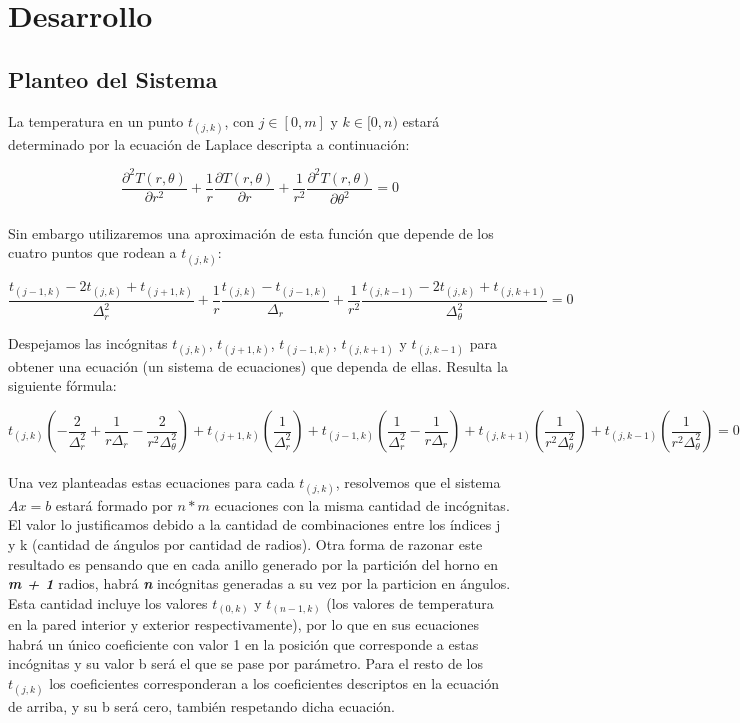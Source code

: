 \section{Desarrollo}

\subsection{Planteo del Sistema}


La temperatura en un punto $t_{(j,k)}$, con $j \in [0, m]$ y $k \in [0, n)$ estará determinado por la ecuación de Laplace descripta a continuación:


$$ \frac{\partial^{2}T(r,\theta)}{\partial r^{2}} + \frac{1}{r} \frac{\partial T(r,\theta)}{\partial r} + \frac{1}{r^{2}} \frac{\partial^{2}T(r,\theta)}{\partial \theta^{2}} = 0$$\\

Sin embargo utilizaremos una aproximación de esta función que depende de los cuatro puntos que rodean a $t_{(j,k)}$:


$$ \frac{t_{(j-1,k)} - 2t_{(j,k)} + t_{(j+1,k)}}{\Delta_{r} ^{2}} + \frac{1}{r} \frac{t_{(j,k)} - t_{(j-1,k)}}{\Delta_{r}} + \frac{1}{r^{2}} \frac{t_{(j,k-1)} - 2t_{(j,k)} + t_{(j,k+1)}}{\Delta_{\theta} ^{2}} = 0$$

Despejamos las incógnitas $t_{(j,k)}$, $t_{(j+1,k)}$, $t_{(j-1,k)}$, $t_{(j,k+1)}$ y $t_{(j,k-1)}$ para obtener una ecuación (un sistema de ecuaciones) que dependa de ellas. Resulta la siguiente fórmula:



$$  t_{(j,k)} (-\frac{2}{\Delta^2_r}+\frac{1}{r \Delta_r}-\frac{2}{r^2 \Delta^2_\theta}) + t_{(j+1,k)} (\frac{1}{\Delta^2_r}) + t_{(j-1,k)} (\frac{1}{\Delta^2_r}-\frac{1}{r \Delta_r}) + t_{(j,k+1)} (\frac{1}{r^2 \Delta^2_\theta}) + t_{(j,k-1)} (\frac{1}{r^2 \Delta^2_\theta}) = 0$$ \\


Una vez planteadas estas ecuaciones para cada $ t_{(j,k)} $, resolvemos que el sistema $Ax = b$ estará formado por $n*m$ ecuaciones con la misma cantidad de incógnitas. El valor lo justificamos debido a la cantidad de combinaciones entre los índices j y k (cantidad de ángulos por cantidad de radios). Otra forma de razonar este resultado es pensando que en cada anillo generado por la partición del horno en \textbf{\textit{m + 1}} radios, habrá \textbf{\textit{n}} incógnitas generadas a su vez por la particion en ángulos. \\
Esta cantidad incluye los valores $t_{(0,k)}$ y $t_{(n-1,k)}$ (los valores de temperatura en la pared interior y exterior respectivamente), por lo que en sus ecuaciones habrá un único coeficiente con valor 1 en la posición que corresponde a estas incógnitas y su valor b será el que se pase por parámetro. Para el resto de los $t_{(j,k)}$ los coeficientes corresponderan a los coeficientes descriptos en la ecuación de arriba, y su b será cero, también respetando dicha ecuación.



